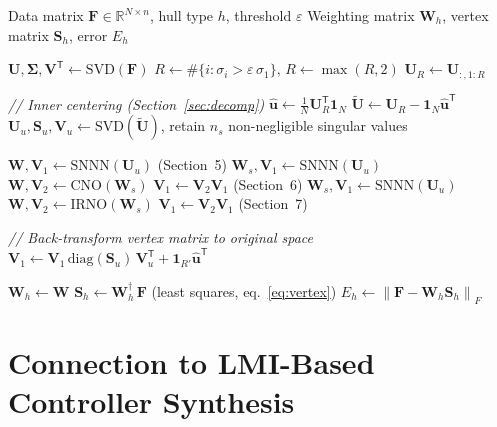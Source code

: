 \documentclass[11pt]{article}
\theoremstyle{definition}
\theoremstyle{plain}
\newcommand{\R}{\mathbb{R}}
\newcommand{\mat}[1]{\mathbf{#1}}
\newcommand{\norm}[1]{\left\|#1\right\|}
\newcommand{\pinv}[1]{#1^{\dagger}}
\newcommand{\ones}{\mathbf{1}}
\newcommand{\T}{\mathsf{T}}
\begin{document}
\begin{algorithm}
\caption{TP Model Transformation of a State Trajectory}
\begin{algorithmic}[1]
\Require Data matrix $\mat{F} \in \R^{N \times n}$, hull type $h$,
         threshold $\varepsilon$
\Ensure Weighting matrix $\mat{W}_h$, vertex matrix $\mat{S}_h$,
        error $E_h$

\State $\mat{U}, \bm{\Sigma}, \mat{V}^\T \leftarrow \mathrm{SVD}(\mat{F})$
\State $R \leftarrow \#\{i : \sigma_i > \varepsilon\,\sigma_1\}$,
       $R \leftarrow \max(R, 2)$
\State $\mat{U}_R \leftarrow \mat{U}_{:,1:R}$

\State \textit{// Inner centering (Section~\ref{sec:decomp})}
\State $\hat{\bm{u}} \leftarrow \frac{1}{N}\mat{U}_R^\T\ones_N$
\State $\tilde{\mat{U}} \leftarrow \mat{U}_R - \ones_N\hat{\bm{u}}^\T$
\State $\mat{U}_u, \mat{S}_u, \mat{V}_u \leftarrow \mathrm{SVD}(\tilde{\mat{U}})$,
       retain $n_s$ non-negligible singular values

  \State $\mat{W}, \mat{V}_1 \leftarrow \mathrm{SNNN}(\mat{U}_u)$
         \hfill (Section~5)
  \State $\mat{W}_s, \mat{V}_1 \leftarrow \mathrm{SNNN}(\mat{U}_u)$
  \State $\mat{W}, \mat{V}_2 \leftarrow \mathrm{CNO}(\mat{W}_s)$
  \State $\mat{V}_1 \leftarrow \mat{V}_2\mat{V}_1$
         \hfill (Section~6)
  \State $\mat{W}_s, \mat{V}_1 \leftarrow \mathrm{SNNN}(\mat{U}_u)$
  \State $\mat{W}, \mat{V}_2 \leftarrow \mathrm{IRNO}(\mat{W}_s)$
  \State $\mat{V}_1 \leftarrow \mat{V}_2\mat{V}_1$
         \hfill (Section~7)
\EndIf

\State \textit{// Back-transform vertex matrix to original space}
  \State $\mat{V}_1 \leftarrow \mat{V}_1\,\mathrm{diag}(\mat{S}_u)\,\mat{V}_u^\T
          + \ones_{R'}\hat{\bm{u}}^\T$
\EndIf

\State $\mat{W}_h \leftarrow \mat{W}$
\State $\mat{S}_h \leftarrow \pinv{\mat{W}_h}\,\mat{F}$
       \hfill (least squares, eq.~\eqref{eq:vertex})
\State $E_h \leftarrow \norm{\mat{F} - \mat{W}_h\mat{S}_h}_F$
\end{algorithmic}
\end{algorithm}


\section{Connection to LMI-Based Controller Synthesis}
\end{document}

